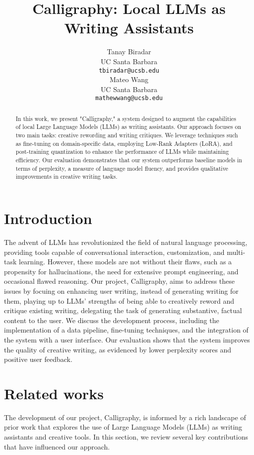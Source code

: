 \documentclass{article}
\title{Calligraphy: Local LLMs as Writing Assistants}
\author{%
  Tanay Biradar\\
  UC Santa Barbara\\
  \texttt{tbiradar@ucsb.edu} \\
  \And
  Mateo Wang\\
  UC Santa Barbara\\
  \texttt{mathewwang@ucsb.edu} \\
}
\begin{document}
\maketitle


\begin{abstract}
  In this work, we present "Calligraphy," a system designed to augment the
  capabilities of local Large Language Models (LLMs) as writing assistants.
  Our approach focuses on two main tasks: creative rewording and writing
  critiques. We leverage techniques such as fine-tuning on domain-specific
  data, employing Low-Rank Adapters (LoRA), and post-training quantization to
  enhance the performance of LLMs while maintaining efficiency. Our
  evaluation demonstrates that our system outperforms baseline models in
  terms of perplexity, a measure of language model fluency, and provides
  qualitative improvements in creative writing tasks.
\end{abstract}


\section{Introduction}


The advent of LLMs has revolutionized the field of natural language processing,
providing tools capable of conversational interaction, customization, and
multi-task learning. However, these models are not without their flaws, such as a
propensity for hallucinations, the need for extensive prompt engineering, and
occasional flawed reasoning. Our project, Calligraphy, aims to address these issues
by focuing on enhancing user writing, instead of generating writing for them,
playing up to LLMs' strengths of being able to creatively reword and critique
existing writing, delegating the task of generating substantive, factual content to
the user. We discuss the development process, including the implementation of a data
pipeline, fine-tuning techniques, and the integration of the system with a user
interface. Our evaluation shows that the system improves the quality of creative
writing, as evidenced by lower perplexity scores and positive user feedback.


\section{Related works}
\label{rel_works}

The development of our project, Calligraphy, is informed by a rich landscape of
prior work that explores the use of Large Language Models (LLMs) as writing
assistants and creative tools. In this section, we review several key
contributions that have influenced our approach.
\end{document}

